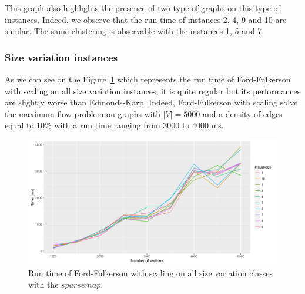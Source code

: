This graph also highlights the presence of two type of graphs on this type of instances. Indeed, we observe that the run time of instances 2, 4, 9 and 10 are similar. The same clustering is observable with the instances 1, 5 and 7.
\subsubsection{Size variation instances}
As we can see on the Figure~\ref{fig:FFmeansize} which represents the run time of Ford-Fulkerson with scaling on all size variation instances, it is quite regular but its performances are slightly worse than Edmonds-Karp. Indeed, Ford-Fulkerson with scaling solve the maximum flow problem on graphs with $|V|=5000$ and a density of edges equal to 10\% with a run time ranging from 3000 to 4000 ms.
\begin{figure}[H]
\begin{center}
\includegraphics[scale=0.5]{images/results/FFmeansize2.png}
\caption{Run time of Ford-Fulkerson with scaling on all size variation classes with the $sparse map$.}
\label{fig:FFmeansize}
\end{center}
\end{figure}
